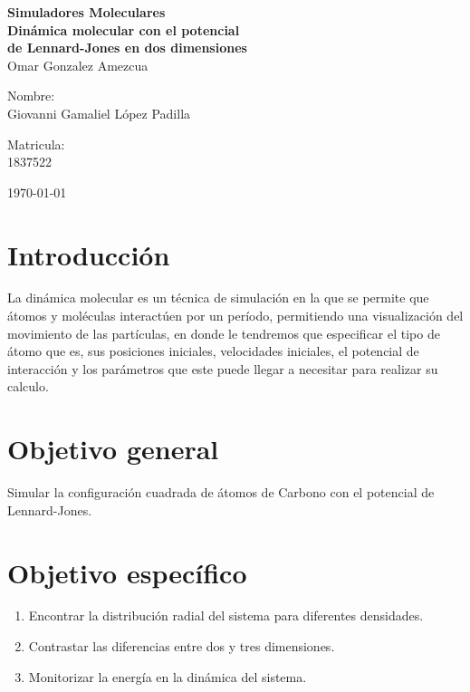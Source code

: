 \documentclass[reprint,amsmath,amssymb,aps,]{revtex4-2}
\begin{document}
\begin{titlepage}
\begin{center}
\begin{large}
\vspace{1cm}
\large{\textbf{Simuladores Moleculares}}\\
\textbf{Dinámica molecular con el potencial \\ de Lennard-Jones en dos dimensiones}\\
Omar Gonzalez Amezcua\\
\end{large}
\vspace{3.5cm}
\begin{minipage}{0.6\linewidth}
\vspace{0.5cm}
\changefontsizes{14pt}
Nombre:\\
Giovanni Gamaliel López Padilla\\
\end{minipage}
\begin{minipage}{0.2\linewidth}
\changefontsizes{14pt}
Matricula:\\
1837522
\end{minipage}
\end{center}
\vspace{4cm}
\begin{flushright}
\today
\end{flushright}
\pagebreak
\end{titlepage}
\maketitle
\section{Introducción}
La dinámica molecular es un técnica de simulación en la que se permite que átomos y moléculas interactúen por un período, permitiendo una visualización del movimiento de las partículas, en donde le tendremos que especificar el tipo de átomo que es, sus posiciones iniciales, velocidades iniciales, el potencial de interacción y los parámetros que este puede llegar a necesitar para realizar su calculo.\\
\section{Objetivo general}
Simular la configuración cuadrada de átomos de Carbono con el potencial de Lennard-Jones.
\section{Objetivo específico}
\begin{enumerate}
    \item Encontrar la distribución radial del sistema para diferentes densidades.
    \item Contrastar las diferencias entre dos y tres dimensiones.
    \item Monitorizar la energía en la dinámica del sistema.
\end{enumerate}
\end{document}
